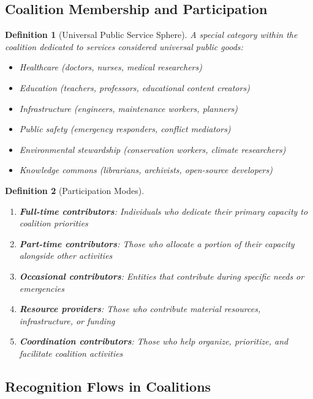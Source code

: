 \documentclass[11pt]{article}
\newtheorem{definition}{Definition}
\begin{document}
\subsection{Coalition Membership and Participation}

\begin{definition}[Universal Public Service Sphere]
A special category within the coalition dedicated to services considered universal public goods:
\begin{itemize}
\item Healthcare (doctors, nurses, medical researchers)
\item Education (teachers, professors, educational content creators)
\item Infrastructure (engineers, maintenance workers, planners)
\item Public safety (emergency responders, conflict mediators)
\item Environmental stewardship (conservation workers, climate researchers)
\item Knowledge commons (librarians, archivists, open-source developers)
\end{itemize}
\end{definition}

\begin{definition}[Participation Modes]
\begin{enumerate}
\item \textbf{Full-time contributors}: Individuals who dedicate their primary capacity to coalition priorities
\item \textbf{Part-time contributors}: Those who allocate a portion of their capacity alongside other activities
\item \textbf{Occasional contributors}: Entities that contribute during specific needs or emergencies
\item \textbf{Resource providers}: Those who contribute material resources, infrastructure, or funding
\item \textbf{Coordination contributors}: Those who help organize, prioritize, and facilitate coalition activities
\end{enumerate}
\end{definition}

\subsection{Recognition Flows in Coalitions}
\end{document}

